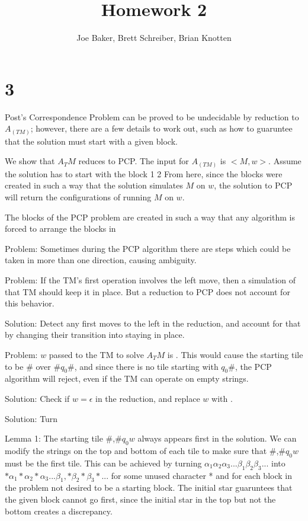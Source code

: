 \documentclass[letterpaper,notitlepage,twoside]{article}
\newcommand{\block}[2] {
\vbox{1}
\vbox{2}
}
\begin{document}
\title{Homework 2}
\author{Joe Baker, Brett Schreiber, Brian Knotten}
\maketitle

\section*{3}
Post's Correspondence Problem can be proved to be undecidable by reduction to $A_(TM)$; however, there are a few details to work out, such as how to guaruntee that the solution must start with a given block.

We show that $A_TM$ reduces to PCP. The input for $A_(TM)$ is $<M, w>$. Assume the solution has to start with the block \block{$#$, #$q_(start)$$w$}. From here, since the blocks were created in such a way that the solution simulates $M$ on $w$, the solution to PCP will return the configurations of running $M$ on $w$.

The blocks of the PCP problem are created in such a way that any algorithm is forced to arrange the blocks in

Problem: Sometimes during the PCP algorithm there are steps which could be taken in more than one direction, causing ambiguity.

Problem: If the TM's first operation involves the left move, then a simulation of that TM should keep it in place. But a reduction to PCP does not account for this behavior.

Solution: Detect any first moves to the left in the reduction, and account for that by changing their transition into staying in place.

Problem: $w$ passed to the TM to solve $A_TM$ is \epsilon. This would cause the starting tile to be \# over \#$q_0$\#, and since there is no tile starting with $q_0$\#, the PCP algorithm will reject, even if the TM can operate on empty strings.

Solution: Check if $w = \epsilon$ in the reduction, and replace $w$ with \square.

Solution: Turn \epsilon 

Lemma 1: The starting tile \#,\#$q_0$$w$ always appears first in the solution.
We can modify the strings on the top and bottom of each tile to make sure that $\#$,$\#$$q_0$$w$ must be the first tile. This can be achieved by turning $\alpha_1\alpha_2\alpha_3...\beta_1\beta_2\beta_3...$ into $*\alpha_1*\alpha_2*\alpha_3...\beta_1,*\beta_2*\beta_3*...$ for some unused character * and for each block in the problem not desired to be a starting block. The initial star guaruntees that the given block cannot go first, since the initial star in the top but not the bottom creates a discrepancy.
\end{document}
